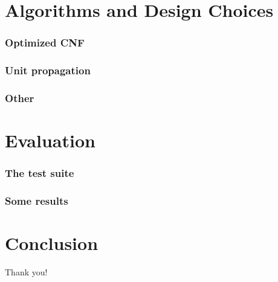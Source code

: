 \documentclass[smaller,dvipsnames]{beamer}
\begin{document}

  \section{Algorithms and Design Choices}

  \begin{frame}
    \frametitle{Optimized CNF}
  \end{frame}

  \begin{frame}
    \frametitle{Unit propagation}
  \end{frame}

  \begin{frame}
    \frametitle{Other}
  \end{frame}

  \section{Evaluation}

  \begin{frame}
    \frametitle{The test suite}
  \end{frame}

  \begin{frame}
    \frametitle{Some results}
  \end{frame}

  \section{Conclusion}


  \begin{frame}[standout]
    Thank you!
  \end{frame}
\end{document}
